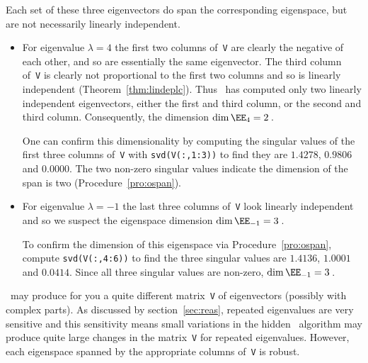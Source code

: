 \begin{example}
\begin{solution}
Each set of these three eigenvectors do span the corresponding eigenspace, but are not necessarily linearly independent.
\begin{itemize}
\item For eigenvalue \(\lambda=4\) the first two columns of~\verb|V| are clearly the negative of each other, and so are essentially the same eigenvector.  
The third column of~\verb|V| is clearly not proportional to the first two columns and so is linearly independent (Theorem~\ref{thm:lindeplc}).
Thus \script\ has computed only two linearly independent eigenvectors, either the first and third column, or the second and third column.
Consequently, the dimension \(\dim\EE_4=2\)\,.

One can confirm this dimensionality by computing the singular values of the first three columns of~\verb|V| with \verb|svd(V(:,1:3))| to find they are \(1.4278\), \(0.9806\) and \(0.0000\).
The two non-zero singular values indicate the dimension of the span is two (Procedure~\ref{pro:ospan}).

\item For eigenvalue \(\lambda=-1\) the last three columns of~\verb|V| look linearly independent and so we suspect the eigenspace dimension \(\dim\EE_{-1}=3\)\,.

To confirm the dimension of this eigenspace via Procedure~\ref{pro:ospan}, compute \verb|svd(V(:,4:6))| to find the three singular values are \(1.4136\), \(1.0001\) and \(0.0414\).
Since all three singular values are non-zero, \(\dim\EE_{-1}=3\)\,.
\end{itemize}
\end{solution}
\script\ may produce for you a quite different matrix~\verb|V| of eigenvectors (possibly with complex parts). 
As discussed by section~\ref{sec:reas}, repeated eigenvalues are very sensitive and this sensitivity means small variations in the hidden \script\ algorithm may produce quite large changes in the matrix~\verb|V| for repeated eigenvalues.
However, each eigenspace spanned by the appropriate columns of~\verb|V| is robust.
\end{example}





